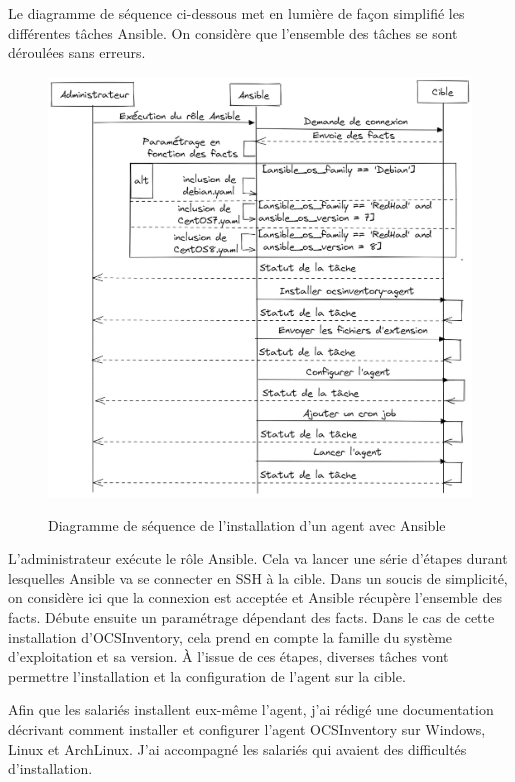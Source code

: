 \documentclass[12pt, a4paper, twoside]{article}
\begin{document}
\newpage
Le diagramme de séquence ci-dessous met en lumière de façon simplifié les différentes tâches \gls{Ansible}. 
On considère que l'ensemble des tâches se sont déroulées sans erreurs.

\begin{figure}[!ht]
    \centering
    \includegraphics[width=\textwidth]{src/graph_ansible_ocs.png}
    \label{fig:ansible_ocs}
    \caption{Diagramme de séquence de l'installation d'un agent avec \gls{Ansible}}
\end{figure}

L'administrateur exécute le rôle \gls{Ansible}.
Cela va lancer une série d'étapes durant lesquelles \gls{Ansible} va se connecter en SSH à la cible.
Dans un soucis de simplicité, on considère ici que la connexion est acceptée et \gls{Ansible} récupère l'ensemble des facts.
Débute ensuite un paramétrage dépendant des facts. 
Dans le cas de cette installation d'\gls{OCSInventory}, cela prend en compte la famille du système d'exploitation et sa version.
À l'issue de ces étapes, diverses tâches vont permettre l'installation et la configuration de l'agent sur la cible.

Afin que les salariés installent eux-même l'agent, j'ai rédigé une documentation décrivant comment installer et configurer l'agent \gls{OCSInventory} sur Windows, \gls{Linux} et ArchLinux.
J'ai accompagné les salariés qui avaient des difficultés d'installation.
\end{document}
